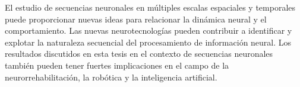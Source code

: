 El estudio de secuencias neuronales en múltiples escalas espaciales y temporales puede proporcionar nuevas ideas para relacionar la dinámica neural y el comportamiento. Las nuevas neurotecnologías pueden contribuir a identificar y explotar la naturaleza secuencial del procesamiento de información neural. Los resultados discutidos en esta tesis en el contexto de secuencias neuronales también pueden tener fuertes implicaciones en el campo de la neurorrehabilitación, la robótica y la inteligencia artificial.